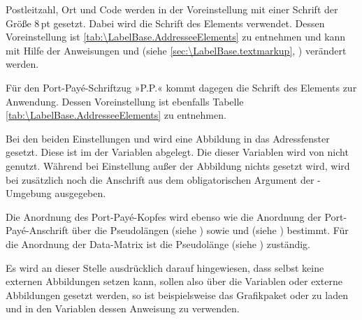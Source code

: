 \BeginIndexGroup
{}
Postleitzahl, Ort und Code werden in der
Voreinstellung mit einer Schrift der Größe 8\,pt gesetzt. Dabei wird die
Schrift des Elements %
 verwendet. Dessen Voreinstellung ist
\autoref{tab:\LabelBase.AddresseeElements} zu entnehmen und kann mit Hilfe der
Anweisungen  und
 (siehe
\autoref{sec:\LabelBase.textmarkup}, )
verändert werden.%
\EndIndexGroup

\BeginIndexGroup
{}
Für den Port-Payé-Schriftzug »P.P.« kommt dagegen die Schrift des Elements
 zur Anwendung. Dessen
Voreinstellung ist ebenfalls Tabelle
\autoref{tab:\LabelBase.AddresseeElements} zu entnehmen.%
\EndIndexGroup

Bei den beiden Einstellungen
und  wird eine Abbildung in das Adressfenster
gesetzt. Diese ist im  der Variablen 
abgelegt. Die  dieser Variablen wird von \KOMAScript{}
nicht genutzt. Während bei Einstellung  außer der
Abbildung nichts gesetzt wird, wird bei
 zusätzlich noch die Anschrift aus dem
obligatorischen Argument der -Umgebung
ausgegeben.

Die Anordnung des Port-Payé-Kopfes wird ebenso wie die Anordnung der
Port-Payé-Anschrift über die Pseudolängen  (siehe
) sowie
 und  (siehe
) bestimmt. Für die
Anordnung der Data-Matrix ist die Pseudolänge 
(siehe )
zuständig.

Es wird an dieser Stelle ausdrücklich darauf hingewiesen,
dass \KOMAScript{} selbst keine externen Abbildungen setzen kann, sollen also
über die Variablen  oder 
externe Abbildungen gesetzt werden, so ist beispielsweise das Grafikpaket
 oder
 zu laden und in den Variablen dessen
Anweisung  zu verwenden.%
\EndIndexGroup


